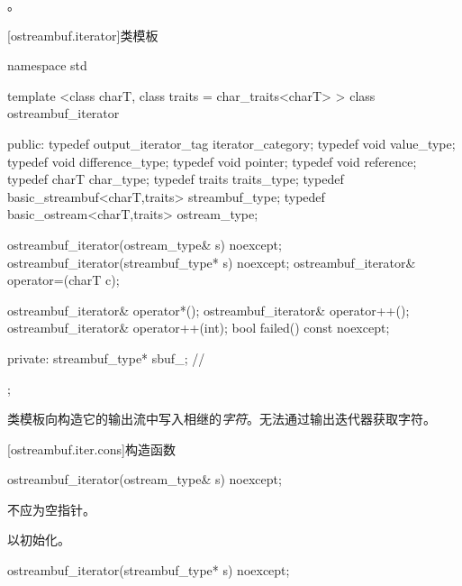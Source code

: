 \begin{itemdescr}
\pnum
\returns
{}。
\end{itemdescr}

[ostreambuf.iterator]{类模板}

%
\begin{codeblock}
namespace std {
  template <class charT, class traits = char_traits<charT> >
  class ostreambuf_iterator {
  public:
    typedef output_iterator_tag           iterator_category;
    typedef void                          value_type;
    typedef void                          difference_type;
    typedef void                          pointer;
    typedef void                          reference;
    typedef charT                         char_type;
    typedef traits                        traits_type;
    typedef basic_streambuf<charT,traits> streambuf_type;
    typedef basic_ostream<charT,traits>   ostream_type;

    ostreambuf_iterator(ostream_type& s) noexcept;
    ostreambuf_iterator(streambuf_type* s) noexcept;
    ostreambuf_iterator& operator=(charT c);

    ostreambuf_iterator& operator*();
    ostreambuf_iterator& operator++();
    ostreambuf_iterator& operator++(int);
    bool failed() const noexcept;

  private:
    streambuf_type* sbuf_;                // \expos
  };
}
\end{codeblock}

\pnum
类模板向构造它的输出流中写入相继的\textit{字符}。无法通过输出迭代器获取字符。

[ostreambuf.iter.cons]{构造函数}


%
\begin{itemdecl}
ostreambuf_iterator(ostream_type& s) noexcept;
\end{itemdecl}

\begin{itemdescr}
\pnum
\requires
{}不应为空指针。

\pnum
\effects
以初始化。
\end{itemdescr}


%
\begin{itemdecl}
ostreambuf_iterator(streambuf_type* s) noexcept;
\end{itemdecl}

